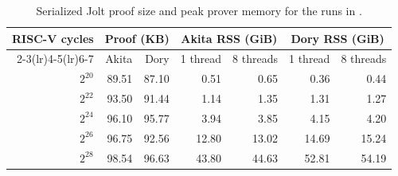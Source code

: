 \begin{table}[H]
\centering
\caption[Jolt communication and memory with Akita and Dory]{Serialized Jolt
proof size and peak prover memory for the runs in
.}
\label{tab:eval-jolt-resources}
\small
\setlength{\tabcolsep}{7pt}
\begin{tabular}{@{}rrrrrrr@{}}
\toprule
RISC-V cycles & \multicolumn{2}{c}{Proof (KB)}
& \multicolumn{2}{c}{Akita RSS (GiB)} & \multicolumn{2}{c}{Dory RSS (GiB)} \\
\cmidrule(lr){2-3}\cmidrule(lr){4-5}\cmidrule(lr){6-7}
& Akita & Dory & 1 thread & 8 threads & 1 thread & 8 threads \\
\midrule
$2^{20}$ & 89.51 & 87.10 & 0.51 & 0.65 & 0.36 & 0.44 \\
$2^{22}$ & 93.50 & 91.44 & 1.14 & 1.35 & 1.31 & 1.27 \\
$2^{24}$ & 96.10 & 95.77 & 3.94 & 3.85 & 4.15 & 4.20 \\
$2^{26}$ & 96.75 & 92.56 & 12.80 & 13.02 & 14.69 & 15.24 \\
$2^{28}$ & 98.54 & 96.63 & 43.80 & 44.63 & 52.81 & 54.19 \\
\bottomrule
\end{tabular}
\end{table}
